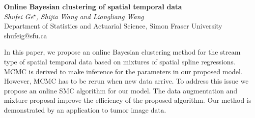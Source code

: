 \documentclass[12pt]{article}
\newcommand{\postertitle}[1]{{\Large\bf #1}\\[12pt]}
\newcommand{\authors}[1]{\emph{#1}\\}
\newcommand{\affiliations}[1]{{#1}\\}
\newcommand{\contacts}[1]{{#1}}
\begin{document}
\begin{center}
\vspace*{0.5cm}
%
\postertitle{Online Bayesian clustering of spatial temporal data}
%
\authors{Shufei Ge$^\star$, Shijia Wang and Liangliang Wang} %
% 
\affiliations{Department of Statistics and Actuarial Science, Simon Fraser University}
%
\contacts{shufeig@sfu.ca} %
%
\vspace*{0.3cm}
\end{center}



In this paper, we propose an online Bayesian clustering method for the stream type of spatial temporal data based on mixtures of spatial spline regressions. MCMC is derived to make inference for the parameters in our proposed model. However, MCMC has to be rerun when new data arrive. To address this issue we propose an online SMC algorithm for our model. The data augmentation and mixture proposal improve the efficiency of the proposed algorithm. Our method is demonstrated by an application to  tumor image data.



\end{document}
